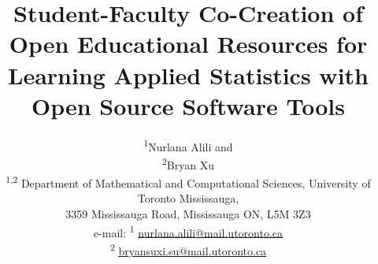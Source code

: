 \documentclass[11pt]{article}
\title{Student-Faculty Co-Creation of Open Educational Resources for Learning Applied Statistics with Open Source Software Tools}
\author{%
    \begin{tabular}{c}
        \textsuperscript{1}Nurlana Alili and\\
        \textsuperscript{2}Bryan Xu \\[6pt]
        \textsuperscript{1,2} Department of Mathematical and Computational Sciences, University of Toronto Mississauga, \\ 
        3359 Mississauga Road, Mississauga ON, L5M 3Z3\\[6pt]
        e-mail: \textsuperscript{1} \href{mailto:nurlana.alili@mail.utoronto.ca}{\uline{nurlana.alili@mail.utoronto.ca}}\\
        \textsuperscript{2} \href{mailto:bryansuxi.su@mail.utoronto.ca}{\uline{bryansuxi.su@mail.utoronto.ca}}
    \end{tabular}%
}
\date{}
\begin{document}
\maketitle

\begin{abstract}
%
%


\end{abstract}
\end{document}
